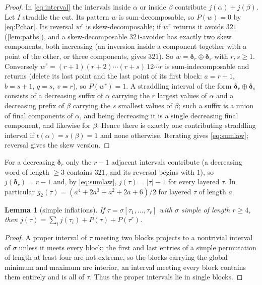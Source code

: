\documentclass[11pt,reqno]{amsart}
\theoremstyle{plain}
\newtheorem{lemma}[lemma]{Lemma}
\theoremstyle{definition}
\theoremstyle{remark}
\newcommand{\dd}{\boldsymbol{\delta}}
\begin{document}
\begin{proof}
In \eqref{eq:interval} the intervals inside $\alpha$ or inside $\beta$ contribute $j(\alpha)+j(\beta)$. Let $I$ straddle the cut. Its pattern $w$ is sum-decomposable, so $P(w)=0$ by \eqref{eq:Pchar}. Its reversal $w^r$ is skew-decomposable; if $w^r$ returns it avoids $321$ (\cref{lem:paths}), and a skew-decomposable $321$-avoider has exactly two skew components, both increasing (an inversion inside a component together with a point of the other, or three components, gives $321$). So $w=\dd_r\oplus\dd_s$ with $r,s\ge1$. Conversely $w^r=(r+1)(r+2)\cdots(r+s)\,12\cdots r$ is sum-indecomposable and returns (delete its last point and the last point of its first block: $a=r+1$, $b=s+1$, $q=s$, $v=r$), so $P(w^r)=1$. A straddling interval of the form $\dd_r\oplus\dd_s$ consists of a decreasing suffix of $\alpha$ carrying the $r$ largest values of $\alpha$ and a decreasing prefix of $\beta$ carrying the $s$ smallest values of $\beta$; such a suffix is a union of final components of $\alpha$, and being decreasing it is a single decreasing final component, and likewise for $\beta$. Hence there is exactly one contributing straddling interval if $t(\alpha)=s(\beta)=1$ and none otherwise. Iterating gives \eqref{eq:sumlaw}; reversal gives the skew version.
\end{proof}

For a decreasing $\dd_r$ only the $r-1$ adjacent intervals contribute (a decreasing word of length $\ge3$ contains $321$, and its reversal begins with $1$), so $j(\dd_r)=r-1$ and, by \eqref{eq:sumlaw}, $j(\tau)=|\tau|-1$ for every layered $\tau$. In particular $g_2(\tau)=(a^4+2a^3+a^2+2a+6)/2$ for layered $\tau$ of length $a$.

\begin{lemma}[simple inflations]\label{lem:simple}
If $\tau=\sigma[\tau_1,\dots,\tau_r]$ with $\sigma$ simple of length $r\ge4$, then $j(\tau)=\sum_i j(\tau_i)+P(\tau)+P(\tau^r)$.
\end{lemma}

\begin{proof}
A proper interval of $\tau$ meeting two blocks projects to a nontrivial interval of $\sigma$ unless it meets every block; the first and last entries of a simple permutation of length at least four are not extreme, so the blocks carrying the global minimum and maximum are interior, an interval meeting every block contains them entirely and is all of $\tau$. Thus the proper intervals lie in single blocks.
\end{proof}
\end{document}
